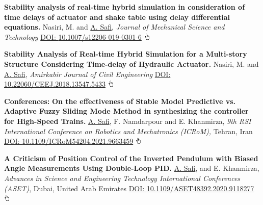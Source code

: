\documentclass[letterpaper,MMMyyyy]{CVTemplate}
\begin{document}
\begin{Body}
\Gap\vspace{6pt}
\BulletItem
\textbf{Stability analysis of real-time hybrid simulation in consideration of time delays of actuator and shake table using delay differential equations.}
Nasiri, M. and \underline{A. Safi},
\textit{Journal of Mechanical Science and Technology}
\newline
\href{https://link.springer.com/article/10.1007/s12206-019-0301-6}{DOI: \textcolor{Forestg}{10.1007/s12206-019-0301-6}} \includegraphics[height=9pt]{icons/hand-cursor.png}
\hfill
\textcolor{OrangeY}{}

\Gap\vspace{6pt}
\BulletItem
\textbf{Stability Analysis of Real-time Hybrid Simulation for a Multi-story Structure Considering Time-delay of Hydraulic Actuator.}
Nasiri, M. and \underline{A. Safi},
\textit{Amirkabir Journal of Civil Engineering}
\newline
\href{https://ceej.aut.ac.ir/article_2911.html?lang=en}{DOI: \textcolor{Forestg}{10.22060/CEEJ.2018.13547.5433}} \includegraphics[height=9pt]{icons/hand-cursor.png}
\hfill
\textcolor{OrangeY}{}
\Gap
\endgroup


\begingroup
\BigGap
\textcolor{Forestg}{\textbf{Conferences:}}
\vspace{4pt}
\BulletItem
\textbf{On the effectiveness of Stable Model Predictive vs. Adaptive Fuzzy Sliding Mode Method in synthesizing the controller for High-Speed Trains.}
\underline{A. Safi}, F. Namdarpour and E. Khanmirza,
\textit{9th RSI International Conference on Robotics and Mechatronics (ICRoM),} Tehran, Iran
\newline
\href{https://ieeexplore.ieee.org/document/9663459}{DOI: \textcolor{Forestg}{10.1109/ICRoM54204.2021.9663459}}
\includegraphics[height=9pt]{icons/hand-cursor.png}
\hfill
\textcolor{OrangeY}{}


\Gap\vspace{6pt}
\BulletItem
\textbf{A Criticism of Position Control of the Inverted Pendulum with Biased Angle Measurements Using Double-Loop PID.}
\underline{A. Safi}, and E. Khanmirza,
\textit{Advances in Science and Engineering Technology International Conferences (ASET)}, Dubai, United Arab Emirates
\newline
\href{https://ieeexplore.ieee.org/document/9118277}{DOI: \textcolor{Forestg}{10.1109/ASET48392.2020.9118277}}
\includegraphics[height=9pt]{icons/hand-cursor.png}
\hfill
\textcolor{OrangeY}{}




\end{Body}
\end{document}
